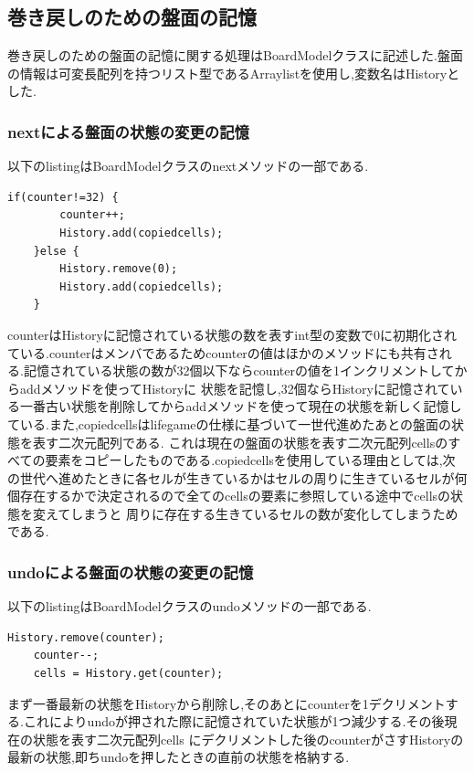 \documentclass[dvipdfmx]{jarticle}
\begin{document}
\subsection{巻き戻しのための盤面の記憶}
巻き戻しのための盤面の記憶に関する処理はBoardModelクラスに記述した.盤面の情報は可変長配列を持つリスト型であるArraylistを使用し,変数名はHistoryとした.
\subsubsection{nextによる盤面の状態の変更の記憶}
以下のlistingはBoardModelクラスのnextメソッドの一部である.
\begin{lstlisting}[caption=nextメソッドの一部,label=fuga]
    if(counter!=32) {
        counter++;
        History.add(copiedcells);
    }else {
        History.remove(0);
        History.add(copiedcells);
    }
\end{lstlisting}
counterはHistoryに記憶されている状態の数を表すint型の変数で0に初期化されている.counterはメンバであるためcounterの値はほかのメソッドにも共有される.記憶されている状態の数が32個以下ならcounterの値を1インクリメントしてからaddメソッドを使ってHistoryに
状態を記憶し,32個ならHistoryに記憶されている一番古い状態を削除してからaddメソッドを使って現在の状態を新しく記憶している.また,copiedcellsはlifegameの仕様に基づいて一世代進めたあとの盤面の状態を表す二次元配列である.
これは現在の盤面の状態を表す二次元配列cellsのすべての要素をコピーしたものである.copiedcellsを使用している理由としては,次の世代へ進めたときに各セルが生きているかはセルの周りに生きているセルが何個存在するかで決定されるので全てのcellsの要素に参照している途中でcellsの状態を変えてしまうと
周りに存在する生きているセルの数が変化してしまうためである.
\subsubsection{undoによる盤面の状態の変更の記憶}
以下のlistingはBoardModelクラスのundoメソッドの一部である.
\begin{lstlisting}[caption=undoメソッドの一部,label=fuga]
    History.remove(counter);
    counter--;
    cells = History.get(counter);
\end{lstlisting}
まず一番最新の状態をHistoryから削除し,そのあとにcounterを1デクリメントする.これによりundoが押された際に記憶されていた状態が1つ減少する.その後現在の状態を表す二次元配列cells
にデクリメントした後のcounterがさすHistoryの最新の状態,即ちundoを押したときの直前の状態を格納する.
\end{document}
